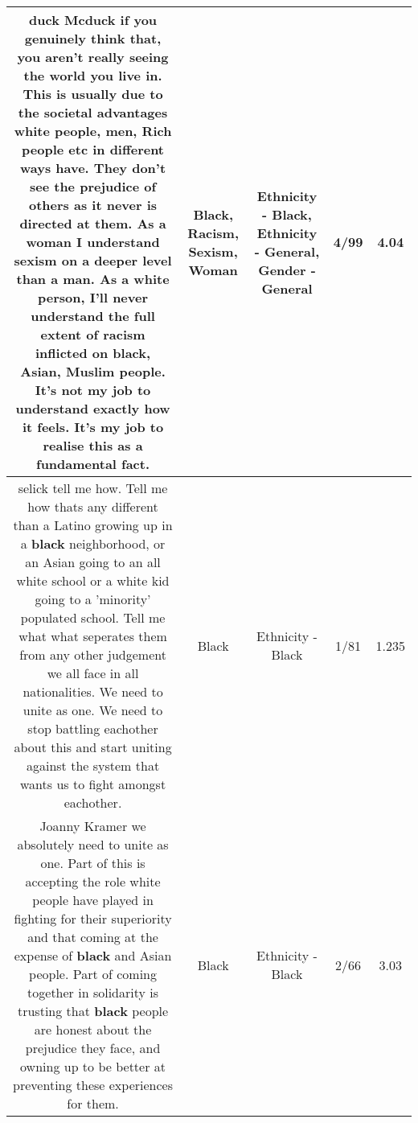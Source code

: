 \documentclass[11pt]{article}
\newlength\mylength
\begin{document}
\begin{center}
\begin{longtable}{|C{.65\mylength}|C{.30\mylength}|C{.12\mylength}|C{.12\mylength}|C{.12\mylength}|}
  \small duck Mcduck if you genuinely think that, you aren't really seeing the world you live in. This is usually due to the societal advantages white people, men, Rich people etc in different ways have. They don't see the prejudice of others as it never is directed at them. As a \textbf{woman} I understand \textbf{sexism} on a deeper level than a man. As a white person, I'll never understand the full extent of \textbf{racism} inflicted on \textbf{black}, Asian, Muslim people. It's not my job to understand exactly how it feels. It's my job to realise this as a fundamental fact.\normalsize   & Black, Racism, Sexism, Woman & Ethnicity - Black, Ethnicity - General, Gender - General & 4/99 & 4.04 \\  \hline
  \small selick tell me how. Tell me how thats any different than a Latino growing up in a \textbf{black} neighborhood, or an Asian going to an all white school or a white kid going to a 'minority' populated school. Tell me what what seperates them from any other judgement we all face in all nationalities. We need to unite as one. We need to stop battling eachother about this and start uniting against the system that wants us to fight amongst eachother.\normalsize   & Black & Ethnicity - Black & 1/81 & 1.235 \\  \hline
  \small Joanny Kramer we absolutely need to unite as one. Part of this is accepting the role white people have played in fighting for their superiority and that coming at the expense of \textbf{black} and Asian people. Part of coming together in solidarity is trusting that \textbf{black} people are honest about the prejudice they face, and owning up to be better at preventing these experiences for them.\normalsize   & Black & Ethnicity - Black & 2/66 & 3.03 \\  \hline

\end{longtable}
\end{center}
\end{document}
